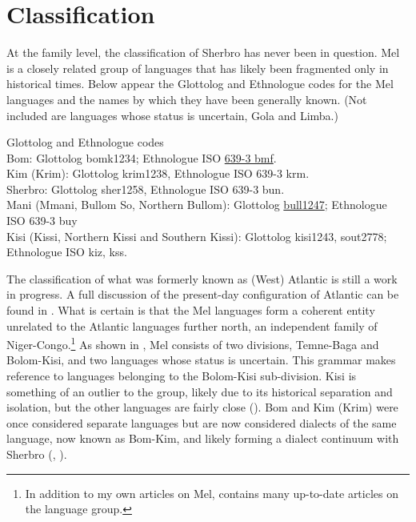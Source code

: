\section{Classification}
\label{sec:1.4}\hypertarget{Toc115517746}{}
At the family level, the classification of Sherbro has never been in question. Mel is a closely related group of languages that has likely been fragmented only in historical times. Below appear the Glottolog and Ethnologue codes for the Mel languages and the names by which they have been generally known. (Not included are languages whose status is uncertain, Gola and Limba.)

\ea\label{ex:3}
 Glottolog and Ethnologue codes\\
 
Bom: Glottolog bomk1234; Ethnologue ISO \href{https://www.ethnologue.com/language/bmf}{639-3 bmf}.\\

Kim (Krim): Glottolog krim1238, Ethnologue ISO 639-3 krm.\\

Sherbro: Glottolog sher1258, Ethnologue ISO 639-3 bun.\\

Mani (Mmani, Bullom So, Northern Bullom): Glottolog \href{https://glottolog.org/resource/languoid/id/bull1247}{bull1247}; Ethnologue ISO 639-3 buy\\

Kisi (Kissi, Northern Kissi and Southern Kissi): Glottolog kisi1243, sout2778; Ethnologue ISO kiz, kss.\\
\z

The classification of what was formerly known as (West) Atlantic is still a work in progress. A full discussion of the present-day configuration of Atlantic can be found in \citet{Childs2024a}. What is certain is that the Mel languages form a coherent entity unrelated to the Atlantic languages further north, an independent family of Niger-Congo.\footnote{In addition to my own articles on Mel, \citet{Lüpke2020}  contains many up-to-date articles on the language group.} As shown in , Mel consists of two divisions, Temne-Baga and Bolom-Kisi, and two languages whose status is uncertain. This grammar makes reference to languages belonging to the Bolom-Kisi sub-division. Kisi is something of an outlier to the group, likely due to its historical separation and isolation, but the other languages are fairly close (\citealt{Childs2024b}). Bom and Kim (Krim) were once considered separate languages but are now considered dialects of the same language, now known as Bom-Kim, and likely forming a dialect continuum with Sherbro (\citealt{Childs2020}, \citealt{Childs2024c}).

